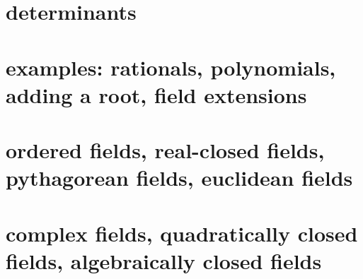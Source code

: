 \section{determinants\titledagger}
\section{examples: rationals, polynomials, adding a root, field extensions}
\section{ordered fields, real-closed fields, pythagorean fields, euclidean fields}
\section{complex fields, quadratically closed fields, algebraically closed fields}


